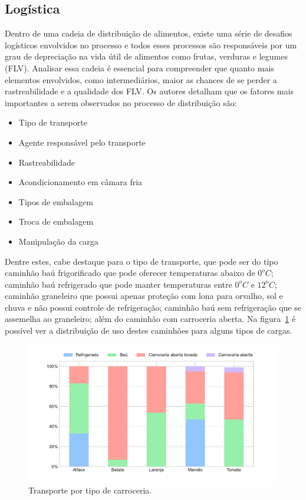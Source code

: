 \subsection{Logística}
Dentro de uma cadeia de distribuição de alimentos, existe uma série de desafios logísticos envolvidos no processo e todos esses processos são responsáveis por um grau de depreciação na vida útil de alimentos como frutas, verduras e legumes (FLV). Analisar essa cadeia é essencial para compreender que quanto mais elementos envolvidos, como intermediários, maior as chances de se perder a rastreabilidade e a qualidade dos FLV.
Os autores  detalham que os fatores mais importantes a serem observados no processo de distribuição são:
\begin{itemize}
    \item Tipo de transporte
    \item Agente responsável pelo transporte
    \item Rastreabilidade
    \item Acondicionamento em câmara fria
    \item Tipos de embalagem
    \item Troca de embalagem
    \item Manipulação da carga
\end{itemize}

Dentre estes, cabe destaque para o tipo de transporte, que pode ser do tipo caminhão baú frigorificado que pode oferecer temperaturas abaixo de $0^oC$; caminhão baú refrigerado que pode manter temperaturas entre $0^oC$ e $12^oC$; caminhão graneleiro que possui apenas proteção com lona para orvalho, sol e chuva e não possui controle de refrigeração; caminhão baú sem refrigeração que se assemelha ao graneleiro; além do caminhão com carroceria aberta. Na figura~\ref{fig:transporte} é possível ver a distribuição de uso destes caminhões para alguns tipos de cargas.

\begin{figure}
  \caption{Transporte por tipo de carroceria.}
  \begin{center}
      \includegraphics[trim={0 1.2cm 0 0.5cm },scale=0.6]{img/transporte.pdf}
  \end{center}
  \label{fig:transporte}
\end{figure}

